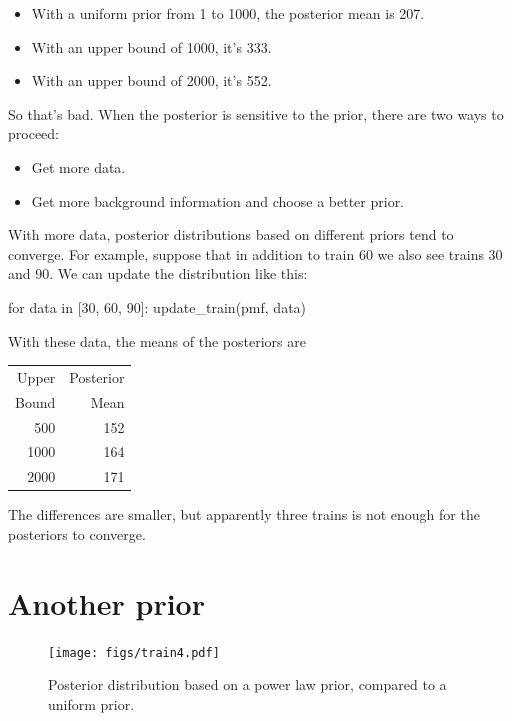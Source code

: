 \documentclass[12pt]{book}
\theoremstyle{exercise}
\begin{document}
\begin{itemize}

\item With a uniform prior from 1 to 1000, the posterior mean is 207.

\item With an upper bound of 1000, it's 333.

\item With an upper bound of 2000, it's 552.

\end{itemize}

So that's bad.  
When the posterior is sensitive to the prior, there are two ways to proceed:

\begin{itemize}

\item Get more data.

\item Get more background information and choose a better prior.

\end{itemize}

With more data, posterior distributions based on different
priors tend to converge.  
For example, suppose that in addition
to train 60 we also see trains 30 and 90.  
We can update the distribution like this:

\begin{code}
for data in [30, 60, 90]:
    update_train(pmf, data)
\end{code}

With these data, the means of the posteriors are

\begin{tabular}{r r}
\toprule
Upper & Posterior \\
Bound & Mean \\
\midrule
500 & 152 \\
1000 & 164\\
2000 & 171\\
\bottomrule
\end{tabular}

The differences are smaller, but apparently three trains is not enough for the posteriors to converge.


\section{Another prior}

\begin{figure}
\centerline{\texttt{[image: figs/train4.pdf]}}
\caption{Posterior distribution based on a power law prior,
compared to a uniform prior.}
\label{fig.train4}
\end{figure}
\end{document}

